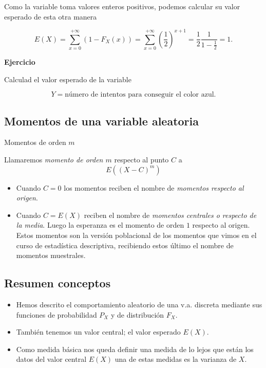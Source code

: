 \documentclass[]{book}
\providecommand{\tightlist}{%
  \setlength{\itemsep}{0pt}\setlength{\parskip}{0pt}}
\begin{document}
Como la variable toma valores enteros positivos, podemos calcular su valor esperado
de esta otra manera

\[E(X)=\sum_{x=0}^{+\infty} (1-F_X(x))=\sum_{x=0}^{+\infty}(\frac12)^{x+1}=\frac12
\frac1{1-\frac12}=1.\]

\textbf{Ejercicio}

Calculad el valor esperado de la variable

\[
Y=\mbox{número de intentos para conseguir el color azul.}
\]

\hypertarget{momentos-de-una-variable-aleatoria}{%
\subsection{Momentos de una variable aleatoria}\label{momentos-de-una-variable-aleatoria}}

 Momentos de orden \(m\)

Llamaremos \emph{momento de orden \(m\)} respecto al punto \(C\) a
\[E\left((X-C)^m\right)\]

\begin{itemize}
\tightlist
\item
  Cuando \(C=0\) los momentos reciben el nombre de \emph{momentos respecto al origen}.
\item
  Cuando \(C=E(X)\) reciben el nombre de \emph{momentos centrales o respecto de la media}. Luego la esperanza es el momento de orden \(1\) respecto al origen. Estos momentos son la versión poblacional de los momentos que vimos en el curso de estadística descriptiva, recibiendo estos último el nombre de momentos muestrales.
\end{itemize}

\hypertarget{resumen-conceptos}{%
\subsection{Resumen conceptos}\label{resumen-conceptos}}

\begin{itemize}
\tightlist
\item
  Hemos descrito el comportamiento aleatorio de una v.a. discreta mediante sus funciones de probabilidad \(P_{X}\) y de distribución \(F_{X}\).
\item
  También tenemos un valor central; el valor esperado \(E(X)\).
\item
  Como medida básica nos queda definir una medida de lo lejos que están los datos del valor central \(E(X)\) una de estas medidas es la varianza de \(X\).
\end{itemize}
\end{document}
